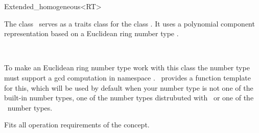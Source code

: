 
\ccAutoIndexingOff
\begin{ccRefClass}{Extended_homogeneous<RT>}
\ccAutoIndexingOn
{}

\ccDefinition
  
The class \ccRefName\ serves as a traits class for the class
.  It uses a polynomial component
representation based on a Euclidean ring number type .


\ccIsModel

%
 \\

\ccCreation
{}  %



To make an Euclidean ring number type
 work with this class the number type must support
a gcd computation in namespace .  \cgal\ provides
a function template for this, which will be used by default when
your number type is  not one of the built-in number types, one of
the number types distrubuted with \cgal\ or one of the \leda\ 
number types.  


\ccOperations

Fits all operation requirements of the concept.

\ccSeeAlso

 \\


\ccIndexTraitsClassEnd
\ccAutoIndexingOff
\end{ccRefClass}
\ccAutoIndexingOn

